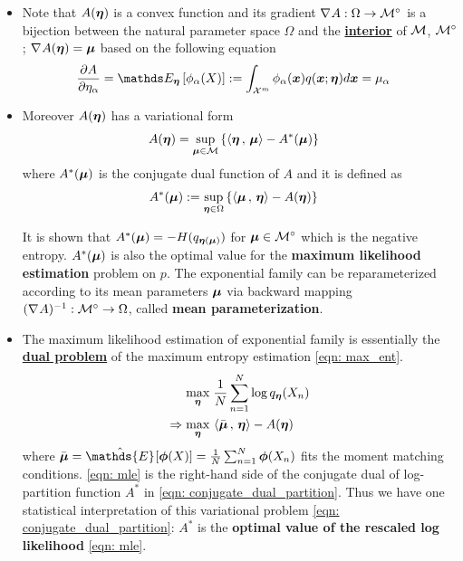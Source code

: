 \documentclass[11pt]{article}
\begin{document}
\begin{itemize}
\item Note that $A(\boldsymbol{\eta})$ is a convex function and its gradient $\nabla_{}{A}: \Omega \rightarrow {\mathcal M}^{\circ}$ is a bijection between the natural parameter space $\Omega$ and the \underline{\textbf{interior}} of ${\mathcal M}$,  ${\mathcal M}^{\circ}$; $\nabla_{}{A}(\boldsymbol{\eta}) = \boldsymbol{\mu}$ based on the following equation 
\begin{align}
\partdiff{A}{\eta_{\alpha}} &= \E{\mb{\eta}}{\phi_{\alpha}(X)} := \int_{\cX^{m}}\phi_{\alpha}(\mb{x}) q(\mb{x}; \mb{\eta}) d\mb{x} = \mu_{\alpha} \label{eqn: partition_first_order}
\end{align}

\item Moreover $A(\boldsymbol{\eta})$ has a variational form 
\begin{align}
A(\boldsymbol{\eta}) &=  \sup_{\boldsymbol{\mu} \in {\mathcal M}}\left\{ \left\langle \boldsymbol{\eta}\,,\, \boldsymbol{\mu} \right\rangle - A^{*}(\boldsymbol{\mu})\right\} \label{eqn: log_partition_variational_form}
\end{align}
where $A^{*}(\boldsymbol{\mu})$ is the conjugate dual function of $A$ and it is defined as
\begin{align}
A^{*}(\boldsymbol{\mu}) &:= \sup_{\boldsymbol{\eta} \in \Omega} \left\{\left\langle \boldsymbol{\mu}\,,\, \boldsymbol{\eta} \right\rangle - A(\boldsymbol{\eta})\right\} \label{eqn: conjugate_dual_partition}
\end{align}

It is shown that $A^{*}(\boldsymbol{\mu})  = -H(q_{\boldsymbol{\eta}(\boldsymbol{\mu})})$ for $\boldsymbol{\mu} \in  {\mathcal M}^{\circ}$ which is the negative entropy. $A^{*}(\boldsymbol{\mu})$ is also the optimal value for the \textbf{maximum likelihood estimation} problem on $p$. The exponential family can be reparameterized according to its mean parameters $\boldsymbol{\mu}$ via backward mapping $(\nabla_{}{A})^{-1}: {\mathcal M}^{\circ} \rightarrow  \Omega$, called \textbf{mean parameterization}.

\item The maximum likelihood estimation of exponential family  is essentially the \underline{\textbf{dual problem}} of the maximum entropy estimation \eqref{eqn: max_ent}.
\begin{align}
\max_{\boldsymbol{\eta}} &\; \frac{1}{N}\sum_{n=1}^{N}\log q_{\boldsymbol{\eta}}(X_{n}) \nonumber\\
\Rightarrow \max_{\boldsymbol{\eta}}&\, \left\langle \bar{\boldsymbol{\mu}}\,,\, \boldsymbol{\eta} \right\rangle - A(\boldsymbol{\eta}) \label{eqn: mle}
\end{align} where $\bar{\mb{\mu}} = \hat{\mathds{E}}_{}[\mb{\phi}(X)] = \frac{1}{N}\sum_{n=1}^{N}\mb{\phi}(X_{n})$ fits the moment matching conditions.  \eqref{eqn: mle} is the right-hand side of the conjugate dual of log-partition function $A^{*}$ in \eqref{eqn: conjugate_dual_partition}. Thus we have one statistical interpretation of this variational problem \eqref{eqn: conjugate_dual_partition}: $A^{*}$ is the \textbf{optimal value of the rescaled log likelihood} \eqref{eqn: mle}. 


\end{itemize}
\end{document}
